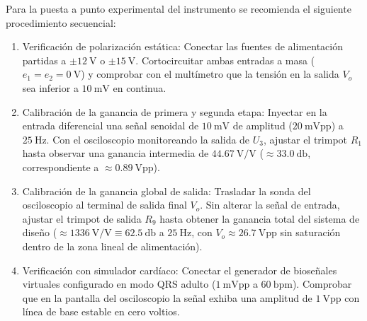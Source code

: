 Para la puesta a punto experimental del instrumento se recomienda el siguiente procedimiento secuencial:
\begin{enumerate}
  \item Verificación de polarización estática:
  Conectar las fuentes de alimentación partidas a $\pm \SI{12}{\volt}$ o $\pm \SI{15}{\volt}$. Cortocircuitar ambas
  entradas a masa ($e_1 = e_2 = \SI{0}{\volt}$) y comprobar con el multímetro que la tensión en la salida $V_o$ sea
  inferior a $\SI{10}{\milli\volt}$ en continua.
  \item Calibración de la ganancia de primera y segunda etapa:
  Inyectar en la entrada diferencial una señal senoidal de $\SI{10}{\milli\volt}$ de amplitud ($\SI{20}{\milli\volt\text{pp}}$) a $\SI{25}{\hertz}$. Con el
  osciloscopio monitoreando la salida de $U_3$, ajustar el trimpot $R_1$ hasta observar una ganancia intermedia de $44.67\ \text{V/V}$ ($\approx \SI{33.0}{\decibel}$, correspondiente a $\approx \SI{0.89}{\volt\text{pp}}$).
  \item Calibración de la ganancia global de salida:
  Trasladar la sonda del osciloscopio al terminal de salida final $V_o$. Sin alterar la señal de entrada, ajustar el
  trimpot de salida $R_9$ hasta obtener la ganancia total del sistema de diseño ($\approx 1336\ \text{V/V} \equiv \SI{62.5}{\decibel}$ a $\SI{25}{\hertz}$, con $V_o \approx \SI{26.7}{\volt\text{pp}}$ sin saturación dentro de la zona lineal de alimentación).
  \item Verificación con simulador cardíaco:
  Conectar el generador de bioseñales virtuales configurado en modo QRS adulto ($1\ \text{mVpp}$ a $60\ \text{bpm}$).
  Comprobar que en la pantalla del osciloscopio la señal exhiba una amplitud de $\SI{1}{\volt\text{pp}}$ con línea de base
  estable en cero voltios.
\end{enumerate}
